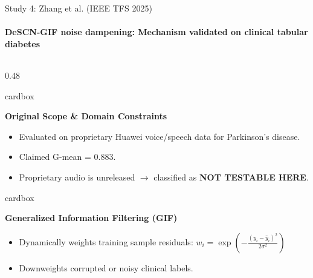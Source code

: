 \documentclass[aspectratio=169, 10pt]{beamer}
\newcommand{\cardbox}[3]{%
  \begin{beamercolorbox}[wd=\linewidth,rounded=true,sep=2.5pt]{cardbox}%
    {\bfseries\scriptsize\color{#1}#2\par}\vspace*{1pt}%
    {\footnotesize #3}%
  \end{beamercolorbox}%
}
\begin{document}
\begin{frame}{Study 4: Zhang et al. (IEEE TFS 2025)}
  \framesubtitle{DeSCN-GIF noise dampening: Mechanism validated on clinical tabular diabetes}

  \begin{columns}[T]
    \begin{column}{0.48\textwidth}
      \cardbox{DeepPurple}{Original Scope \& Domain Constraints}{
        \begin{itemize}\setlength\itemsep{1pt}\scriptsize
          \item Evaluated on proprietary Huawei voice/speech data for Parkinson's disease.
          \item Claimed G-mean = 0.883.
          \item Proprietary audio is unreleased $\to$ classified as \textcolor{MutedText}{\bfseries NOT TESTABLE HERE}.
        \end{itemize}
      }
      \vspace*{3pt}
      \cardbox{MedPurple}{Generalized Information Filtering (GIF)}{
        \begin{itemize}\setlength\itemsep{1pt}\scriptsize
          \item Dynamically weights training sample residuals:
          $w_i = \exp\left(-\frac{(y_i - \hat{y}_i)^2}{2\sigma^2}\right)$
          \item Downweights corrupted or noisy clinical labels.
        \end{itemize}
      }
    \end{column}


\end{columns}
\end{frame}
\end{document}

